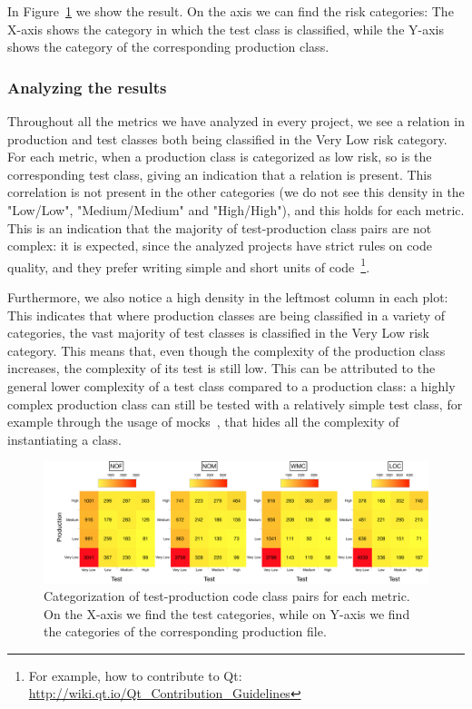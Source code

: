 In Figure~\ref{fig:heat_map} we show the result. On the axis we can find the risk categories: The X-axis shows the category in which the test class is classified, while the Y-axis shows the category of the corresponding production class. 

\subsubsection{Analyzing the results}
Throughout all the metrics we have analyzed in every project, we see a relation in production and test classes both being classified in the Very Low risk category. For each metric, when a production class is categorized as low risk, so is the corresponding test class, giving an indication that a relation is present. 
This correlation is not present in the other categories (we do not see this density in the "Low/Low", "Medium/Medium" and "High/High"), and this holds for each metric. This is an indication that the majority of test-production class pairs are not complex: it is expected, since the analyzed projects have strict rules on code quality, and they prefer writing simple and short units of code~\footnote{For example, how to contribute to Qt: \url{http://wiki.qt.io/Qt_Contribution_Guidelines}}. 

Furthermore, we also notice a high density in the leftmost column in each plot: This indicates that where production classes are being classified in a variety of categories, the vast majority of test classes is classified in the Very Low risk category. This means that, even though the complexity of the production class increases, the complexity of its test is still low. 
This can be attributed to the general lower complexity of a test class compared to a production class: a highly complex production class can still be tested with a relatively simple test class, for example through the usage of mocks~\cite{Spadini}, that hides all the complexity of instantiating a class.

\begin{figure}
    \centering
    \includegraphics[width=\textwidth]{resources/heat_map.pdf}
    \caption{Categorization of test-production code class pairs for each metric. On the X-axis we find the test categories, while on Y-axis we find the categories of the corresponding production file.}
    \label{fig:heat_map}
\end{figure}
